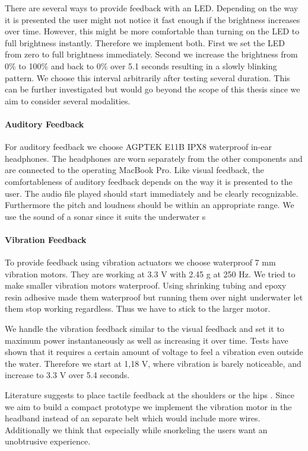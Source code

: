 There are several ways to provide feedback with an LED.
Depending on the way it is presented the user might not notice it fast enough if the brightness increases over time.
However, this might be more comfortable than turning on the LED to full brightness instantly.
Therefore we implement both.
First we set the LED from zero to full brightness immediately.
Second we increase the brightness from 0\% to 100\%  and back to 0\% over 5.1 seconds resulting in a slowly blinking pattern.
We choose this interval arbitrarily after testing several duration.
This can be further investigated but would go beyond the scope of this thesis since we aim to consider several modalities.


\paragraph{Auditory Feedback}

For auditory feedback we choose AGPTEK E11B IPX8 waterproof in-ear headphones.
The headphones are worn separately from the other components and are connected to the operating MacBook Pro.
Like visual feedback, the comfortableness of auditory feedback depends on the way it is presented to the user. 
The audio file played should start immediately and be clearly recognizable.
Furthermore the pitch and loudness should be within an appropriate range.
We use the sound of a sonar since it suits the underwater s%


\paragraph{Vibration Feedback}

To provide feedback using vibration actuators we choose waterproof 7 mm vibration motors.
They are working at 3.3 V with 2.45 g at 250 Hz.
We tried to make smaller vibration motors waterproof.
Using shrinking tubing and epoxy resin adhesive made them waterproof but running them over night underwater let them stop working regardless.
Thus we have to stick to the larger motor.

We handle the vibration feedback similar to the visual feedback and set it to maximum power instantaneously as well as increasing it over time.
Tests have shown that it requires a certain amount of voltage to feel a vibration even outside the water.
Therefore we start at 1,18 V, where vibration is barely noticeable, and increase to 3.3 V over 5.4 seconds.

Literature suggests to place tactile feedback at the shoulders or the hips \citep{Kiss:2018:NSM:3173574.3174191}.
Since we aim to build a compact prototype we implement the vibration motor in the headband instead of an separate belt which would include more wires.
Additionally we think that especially while snorkeling the users want an unobtrusive experience.


